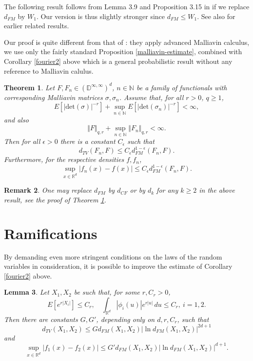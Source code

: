 \documentclass{article}
\newtheorem{theorem}{Theorem}[section]
\newtheorem{lemma}[theorem]{Lemma}
\newtheorem{remark}[theorem]{Remark}
\begin{document}
The following result follows from Lemma 3.9 and Proposition 3.15 in \cite{bc2} if we replace $d_{FM}$
by $W_{1}$. Our version is thus slightly stronger since $d_{FM}\leq W_{1}$. See
also \cite{bc1} for earlier related results.

Our proof is quite different from that of \cite{bc2}: they apply advanced Malliavin calculus,
we use only the fairly standard Proposition \ref{malliavin-estimate}, combined with Corollary \ref{fourier2} above
which is a general probabilistic result without any reference to Malliavin calulus.

\begin{theorem}\label{smoothsequence1} 
Let $F,F_{n}\in (\mathbb{D}^{\infty,\infty})^{d}$, $n\in \mathbb{N}$ be a family of functionals
with corresponding Malliavin matrices $\sigma,\sigma_{n}$.
Assume that, for all $r>0$, $q\geq 1$,
$$
E[|\mathrm{det}(\sigma)|^{-r}]+\sup_{n\in \mathbb{N}}E[|\mathrm{det}(\sigma_{n})|^{-r}]<\infty,
$$
and also 
$$
\Vert F\Vert_{q,r}+\sup_{n\in\mathbb{N}}\Vert F_{n}\Vert_{q,r}<\infty.
$$	
Then for all $\epsilon>0$ there is a constant $C_{\epsilon}$ such that
$$
d_{TV}(F_{n},F)\leq C_{\epsilon}d_{FM}^{1-\epsilon}(F_{n},F).
$$
Furthermore, for the respective densities $f,f_{n}$,
$$
\sup_{x\in\mathbb{R}^{d}}|f_{n}(x)-f(x)|\leq C_{\epsilon}d_{FM}^{1-\epsilon}(F_{n},F).
$$
\end{theorem}

\begin{remark}\label{romi}
{\rm One may replace $d_{FM}$ by $d_{CF}$ or by $d_{k}$ for any $k\geq 2$ in the above result, see the
proof of Theorem \ref{smoothsequence1}.
}
\end{remark}





\section{Ramifications}\label{ramif}

By demanding even more stringent conditions on the laws of the random variables in consideration,
it is possible to improve the estimate of Corollary \ref{fourier2} above.

\begin{lemma}\label{exx}
Let $X_{1},X_{2}$ be such that, for some $r,C_{r}>0$, 
\begin{equation}\label{kati} 
E[e^{r|X_{i}|}]\leq C_{r},\quad  
\int_{\mathbb{R}^{d}}|\phi_{i}(u)|e^{r|u|}\, du\leq C_{r},\ i=1,2.
\end{equation}
Then there are constants $G,G'$, depending only on $d,r,C_{r}$, such that
\begin{equation}\label{otto}
d_{TV}(X_{1},X_{2})\leq G d_{FM}(X_{1},X_{2})|\ln d_{FM}(X_{1},X_{2})|^{2d+1}
\end{equation}
and 
\begin{equation}\label{toto}
\sup_{x\in\mathbb{R}^{d}}|f_{1}(x)-f_{2}(x)|\leq G' d_{FM}(X_{1},X_{2})|\ln d_{FM}(X_{1},X_{2})|^{d+1}.
\end{equation}
\end{lemma}
\end{document}
